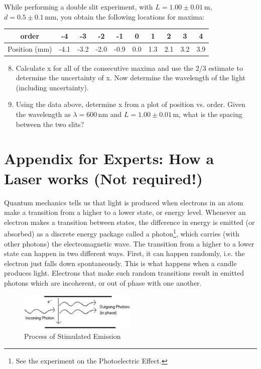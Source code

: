 While performing a double slit experiment, with $L = 1.00\pm 0.01\,\mathrm{m}$, $d = 0.5\pm 0.1\, \mathrm{mm}$, you obtain the following locations for maxima:
\begin{table}[h]
  \centering
  \begin{tabular}{|c|c|c|c|c|c|c|c|c|c|}
    \hline
    order&-4&-3&-2&-1&0&1&2&3&4\\
    \hline
    Position (mm)&-4.1&-3.2&-2.0&-0.9&0.0&1.3&2.1&3.2&3.9\\
    \hline
  \end{tabular}
\end{table}
\begin{enumerate}\setcounter{enumi}{7}
\item Calculate x for all of the consecutive maxima and use the 2/3 estimate to determine the uncertainty of x. Now determine the wavelength of the light (including uncertainty).
\item Using the data above, determine x from a plot of position vs. order. Given the wavelength as $\lambda = 600\,\mathrm{nm}$ and $L = 1.00\pm 0.01\,\mathrm{m}$, what is the spacing between the two slits?
\end{enumerate}

\section{Appendix for Experts: How a Laser works (Not required!)}
Quantum mechanics tells us that light is produced when electrons in an atom make a transition from a higher to a lower state, or energy level. Whenever an electron makes a
transition between states, the difference in energy is emitted (or absorbed) as a discrete energy package called a photon\footnote{See the experiment on the Photoelectric Effect.}, which carries (with other photons) the electromagnetic wave. The transition from a higher to a lower state can happen in two different ways. First, it can happen randomly, i.e. the electron just falls down spontaneously. This is what happens when a candle produces light. Electrons that make such random transitions result in emitted photons which are incoherent, or out of phase with one another. \myskip
\begin{figure}[h]
\centering
\includegraphics[width=0.5\textwidth]{./Exp7/pic/image9.png}
\caption{Process of Stimulated Emission}
\label{fig:stimulatedemission}
\end{figure}

